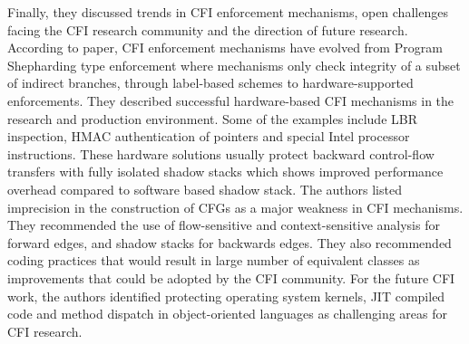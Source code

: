 \documentclass[dvips,12pt]{article}
\begin{document}
Finally, they discussed trends in CFI enforcement mechanisms, open challenges facing the CFI research community and the direction of future research. According to paper, CFI enforcement mechanisms have evolved from Program Shepharding type enforcement where mechanisms only check integrity of a subset of indirect branches, through label-based schemes to hardware-supported enforcements. They described successful hardware-based CFI mechanisms in the research and production environment. Some of the examples include LBR inspection, HMAC authentication of pointers and special Intel processor instructions. These hardware solutions usually protect backward control-flow transfers with fully isolated shadow stacks which shows improved performance overhead compared to software based shadow stack. The authors listed imprecision in the construction of CFGs as a major weakness in CFI mechanisms. They recommended the use of flow-sensitive and context-sensitive analysis for forward edges, and shadow stacks for backwards edges. They also recommended coding practices that would result in large number of equivalent classes as improvements that could be adopted by the CFI community.     For the future CFI work, the authors identified protecting operating system kernels, JIT compiled code and method dispatch in object-oriented languages as challenging areas for CFI research.










 





\end{document}
